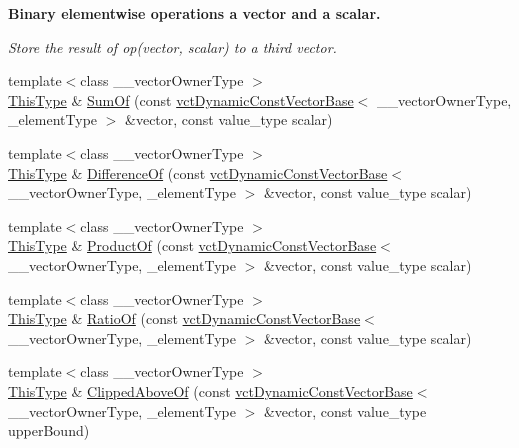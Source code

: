 \begin{Indent}{\bf Binary elementwise operations a vector and a scalar.}\par
{\em Store the result of op(vector, scalar) to a third vector. }\begin{DoxyCompactItemize}
\item 
{\footnotesize template$<$class \-\_\-\-\_\-vector\-Owner\-Type $>$ }\\\hyperlink{classvct_dynamic_const_vector_base_a39da273523717f678f54d3321ebca3dd}{This\-Type} \& \hyperlink{classvct_dynamic_vector_base_a2c0062999ae26dc98c2ba1bfdb98caa0}{Sum\-Of} (const \hyperlink{classvct_dynamic_const_vector_base}{vct\-Dynamic\-Const\-Vector\-Base}$<$ \-\_\-\-\_\-vector\-Owner\-Type, \-\_\-element\-Type $>$ \&vector, const value\-\_\-type scalar)
\item 
{\footnotesize template$<$class \-\_\-\-\_\-vector\-Owner\-Type $>$ }\\\hyperlink{classvct_dynamic_const_vector_base_a39da273523717f678f54d3321ebca3dd}{This\-Type} \& \hyperlink{classvct_dynamic_vector_base_a718ed377442500d229e086d991930b6b}{Difference\-Of} (const \hyperlink{classvct_dynamic_const_vector_base}{vct\-Dynamic\-Const\-Vector\-Base}$<$ \-\_\-\-\_\-vector\-Owner\-Type, \-\_\-element\-Type $>$ \&vector, const value\-\_\-type scalar)
\item 
{\footnotesize template$<$class \-\_\-\-\_\-vector\-Owner\-Type $>$ }\\\hyperlink{classvct_dynamic_const_vector_base_a39da273523717f678f54d3321ebca3dd}{This\-Type} \& \hyperlink{classvct_dynamic_vector_base_afabc21a02bc651668a08467c94d63edf}{Product\-Of} (const \hyperlink{classvct_dynamic_const_vector_base}{vct\-Dynamic\-Const\-Vector\-Base}$<$ \-\_\-\-\_\-vector\-Owner\-Type, \-\_\-element\-Type $>$ \&vector, const value\-\_\-type scalar)
\item 
{\footnotesize template$<$class \-\_\-\-\_\-vector\-Owner\-Type $>$ }\\\hyperlink{classvct_dynamic_const_vector_base_a39da273523717f678f54d3321ebca3dd}{This\-Type} \& \hyperlink{classvct_dynamic_vector_base_a65511640e701d17de999787dae10624a}{Ratio\-Of} (const \hyperlink{classvct_dynamic_const_vector_base}{vct\-Dynamic\-Const\-Vector\-Base}$<$ \-\_\-\-\_\-vector\-Owner\-Type, \-\_\-element\-Type $>$ \&vector, const value\-\_\-type scalar)
\item 
{\footnotesize template$<$class \-\_\-\-\_\-vector\-Owner\-Type $>$ }\\\hyperlink{classvct_dynamic_const_vector_base_a39da273523717f678f54d3321ebca3dd}{This\-Type} \& \hyperlink{classvct_dynamic_vector_base_aff114456352f054cfa33dcf55504d488}{Clipped\-Above\-Of} (const \hyperlink{classvct_dynamic_const_vector_base}{vct\-Dynamic\-Const\-Vector\-Base}$<$ \-\_\-\-\_\-vector\-Owner\-Type, \-\_\-element\-Type $>$ \&vector, const value\-\_\-type upper\-Bound)

\end{DoxyCompactItemize}
\end{Indent}
